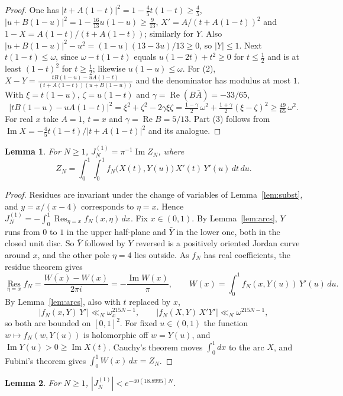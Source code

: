 \documentclass{amsart}
\newtheorem{lemma}{Lemma}[section]
\numberwithin{equation}{section}
\numberwithin{table}{section}
\newcommand{\Res}{\operatorname*{Res}}
\begin{document}
\begin{proof}
One has $|t+A(1-t)|^2=1-\frac45t(1-t)\ge\frac45$,
$|u+B(1-u)|^2=1-\frac{16}{13}u(1-u)\ge\frac9{13}$,
$X'=A/(t+A(1-t))^2$ and $1-X=A(1-t)/(t+A(1-t))$; similarly for $Y$.
Also $|u+B(1-u)|^2-u^2=(1-u)(13-3u)/13\ge0$, so $|Y|\le1$. Next
$t(1-t)\le\omega$, since $\omega-t(1-t)$ equals $u(1-2t)+t^2\ge0$ for
$t\le\frac12$ and is at least $(1-t)^2$ for $t\ge\frac12$; likewise
$u(1-u)\le\omega$. For (2),
$X-Y=\frac{tB(1-u)-uA(1-t)}{(t+A(1-t))(u+B(1-u))}$ and the denominator has
modulus at most $1$. With $\xi=t(1-u)$, $\zeta=u(1-t)$ and
$\gamma=\operatorname{Re}(B\bar A)=-33/65$,
\[
|tB(1-u)-uA(1-t)|^2=\xi^2+\zeta^2-2\gamma\xi\zeta
=\tfrac{1-\gamma}2\,\omega^2+\tfrac{1+\gamma}2(\xi-\zeta)^2\ge\tfrac{49}{65}\,\omega^2 .
\]
For real $x$ take $A=1$, $t=x$ and $\gamma=\operatorname{Re}B=5/13$. Part (3)
follows from $\operatorname{Im}X=-\frac45t(1-t)/|t+A(1-t)|^2$ and its
analogue.
\end{proof}

\begin{lemma}\label{lem:contour}
For $N\ge1$, $J_N^{(1)}=\pi^{-1}\operatorname{Im}Z_N$, where
\[
Z_N=\int_0^1\!\!\int_0^1f_N\bigl(X(t),Y(u)\bigr)\,X'(t)\,Y'(u)\,dt\,du .
\]
\end{lemma}

\begin{proof}
Residues are invariant under the change of variables of
Lemma~\ref{lem:subst}, and $y=x/(x-4)$ corresponds to $\eta=x$. Hence
$J_N^{(1)}=-\int_0^1\Res_{\eta=x}f_N(x,\eta)\,dx$. Fix $x\in(0,1)$. By
Lemma~\ref{lem:arcs}, $Y$ runs from $0$ to $1$ in the upper half-plane and
$\bar Y$ in the lower one, both in the closed unit disc. So $\bar Y$ followed
by $Y$ reversed is a positively oriented Jordan curve around $x$, and the
other pole $\eta=4$ lies outside. As $f_N$ has real coefficients, the residue
theorem gives
\[
\Res_{\eta=x}f_N=\frac{\overline{W(x)}-W(x)}{2\pi i}=-\frac{\operatorname{Im}W(x)}{\pi},
\qquad W(x)=\int_0^1f_N(x,Y(u))\,Y'(u)\,du .
\]
By Lemma~\ref{lem:arcs}, also with $t$ replaced by $x$,
\[
|f_N(x,Y)\,Y'|\ll_N\omega_x^{215N-1},\qquad |f_N(X,Y)\,X'Y'|\ll_N\omega^{215N-1},
\]
so both are bounded on $[0,1]^2$. For
fixed $u\in(0,1)$ the function $w\mapsto f_N(w,Y(u))$ is holomorphic off
$w=Y(u)$, and $\operatorname{Im}Y(u)>0\ge\operatorname{Im}X(t)$. Cauchy's
theorem moves $\int_0^1dx$ to the arc $X$, and Fubini's theorem gives
$\int_0^1W(x)\,dx=Z_N$.
\end{proof}

\begin{lemma}\label{lem:res}
For $N\ge1$, $|J_N^{(1)}|<e^{-40(18.8995)N}$.
\end{lemma}
\end{document}
